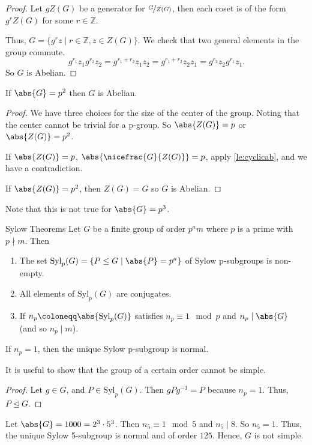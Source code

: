\begin{proof}
    Let \(gZ(G)\) be a generator for \(\nicefrac{G}{Z(G)}\), then each coset is of the form \(g^{r}Z(G)\) for some \(r \in \mathbb{Z}\).

    Thus, \(G = \{g^{r}z\mid r\in \mathbb{Z}, z\in Z(G)\}\). We check that two general elements in the group commute.
    \[
        g^{r_1}z_1 g^{r_2}z_2 = g^{r_1 + r_2}z_{1}z_2= g^{r_1 + r_2}z_{2}z_1=g^{r_2}z_2 g^{r_1}z_1.
    \]
    So \(G\) is Abelian.
\end{proof}
\begin{corollary}{}{}
    If \(\abs{G} =p^2\) then \(G\) is Abelian.
\end{corollary}
\begin{proof}
    We have three choices for the size of the center of the group. Noting that the center cannot be trivial for a p-group. So \(\abs{Z(G)} = p\) or \(\abs{Z(G)} = p^2\).

    If \(\abs{Z(G)} = p\), \(\abs{\nicefrac{G}{Z(G)}} = p\), apply \cref{le:cyclicab}, and we have a contradiction.

    If \(\abs{Z(G)} = p^2\), then \(Z(G) = G\) so \(G\) is Abelian.
\end{proof}
Note that this is not true for \(\abs{G} = p^3\).
\begin{theorem}{Sylow Theorems}{}
    Let \(G\) be a finite group of order \(p^a m\) where \(p\) is a prime with \(p \nmid m\). Then
    \begin{enumerate}
        \item The set \(\mathrm{Syl}_p(G) = \{P \leq G\mid \abs{P} = p^a\}\) of Sylow p-subgroups is non-empty.
        \item All elements of \(\mathrm{Syl}_p(G)\) are conjugates.
        \item If \(n_p\coloneqq \abs{\mathrm{Syl}_p(G)} \) satisfies \(n_p \equiv 1 \mod p\) and \(n_p \mid \abs{G} \) (and so \(n_p\mid m\)).
    \end{enumerate}
\end{theorem}
\begin{corollary}{}{}
    If \(n_p = 1\), then the unique Sylow p-subgroup is normal.
\end{corollary}
It is useful to show that the group of a certain order cannot be simple.
\begin{proof}
    Let \(g \in G\), and \(P \in \mathrm{Syl}_p(G)\). Then \(gPg^{-1} = P\) because \(n_p = 1\). Thus, \(P \trianglelefteq G\).
\end{proof}
\begin{example}
    Let \(\abs{G} = 1000 = 2^3\cdot 5^3\). Then \(n_5 \equiv 1 \mod 5\) and \(n_5 \mid 8\). So \(n_5 = 1\). Thus, the unique Sylow 5-subgroup is normal and of order \(125\). Hence, \(G\) is not simple.
\end{example}

